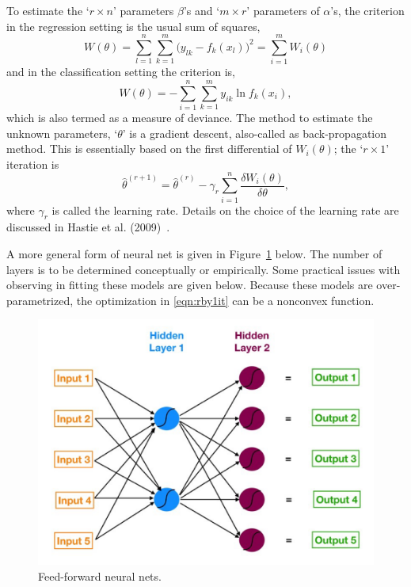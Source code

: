 To estimate the `$r \times n$' parameters $\beta$'s and `$m \times r$' parameters of $\alpha$'s, the criterion in the regression setting is the usual sum of squares,
	\begin{equation} \label{eqn:bigwtheta}
	W(\theta)= \sum_{l=1}^n \sum_{k=1}^m \big(y_{lk} - f_k(x_l)\big)^2 = \sum_{i=1}^m W_i(\theta)
	\end{equation}
and in the classification setting the criterion is, 
	\begin{equation} \label{eqn:bigwtheta2}
	W(\theta)= - \sum_{i=1}^n \sum_{k=1}^m y_{ik} \ln f_k(x_i),
	\end{equation}
which is also termed as a measure of deviance. The method to estimate the unknown parameters, `$\theta$' is a gradient descent, also-called as back-propagation method. This is essentially based on the first differential of $W_i(\theta)$; the `$r \times 1$' iteration is
	\begin{equation} \label{eqn:rby1it}
	\hat{\theta}^{(r+1)}= \hat{\theta}^{(r)} - \gamma_r \sum_{i=1}^n \dfrac{\delta W_i(\theta)}{\delta \theta},
	\end{equation}
where $\gamma_r$ is called the learning rate. Details on the choice of the learning rate are discussed in Hastie et al. (2009)~\cite{hastibf}. 


A more general form of neural net is given in Figure~\ref{fig:neural_net} below. The number of layers is to be determined conceptually or empirically. Some practical issues with observing in fitting these models are given below. Because these models are over-parametrized, the optimization in \eqref{eqn:rby1it} can be a nonconvex function.


	\begin{figure}[!ht]
	\centering
	\includegraphics[width=\textwidth]{chapters/chapter_advanced/figures/input_output.png}	
	\caption{Feed-forward neural nets. \label{fig:neural_net}}
	\end{figure}



